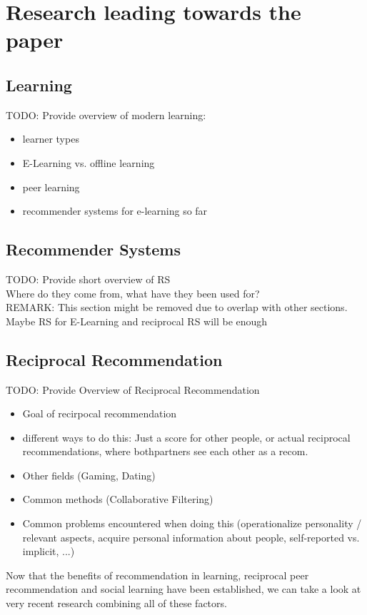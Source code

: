 \documentclass[nochapterpage,bigchapter,linedtoc,longdoc,colorback,accentcolor=tud3b]{tudreport}
\begin{document}
\chapter{Research leading towards the paper}
\section{Learning}
TODO: Provide overview of modern learning:\\
\begin{itemize}
	\item learner types
	\item E-Learning vs. offline learning
	\item peer learning
	\item recommender systems for e-learning so far
\end{itemize}

\section{Recommender Systems}
TODO: Provide short overview of RS\\
Where do they come from, what have they been used for?\\
REMARK: This section might be removed due to overlap with other sections. Maybe RS for E-Learning and reciprocal RS will be enough\\

\section{Reciprocal Recommendation}
TODO: Provide Overview of Reciprocal Recommendation\\
\begin{itemize}
	\item Goal of recirpocal recommendation
	\item different ways to do this: Just a score for other people, or actual reciprocal recommendations, where bothpartners see each other as a recom.
	\item Other fields (Gaming, Dating)
	\item Common methods (Collaborative Filtering)
	\item Common problems encountered when doing this (operationalize personality / relevant aspects, acquire personal information about people, self-reported vs. implicit, ...)
\end{itemize}
Now that the benefits of recommendation in learning, reciprocal peer recommendation and social learning have been established, we can take a look at very recent research combining all of these factors.\\
\end{document}
